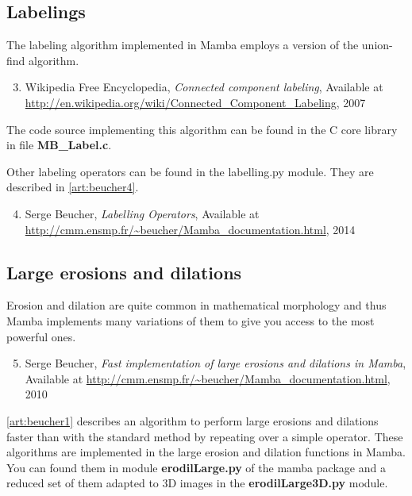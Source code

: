 \documentclass[a4paper,10pt,oneside]{article}
\begin{document}
\subsection{Labelings}

The labeling algorithm implemented in Mamba employs a version of the union-find 
algorithm.

\begin{enumerate}
\setcounter{enumi}{2}
\item \label{art:wikipedia} Wikipedia Free Encyclopedia, 
\emph{Connected component labeling},
Available at \url{http://en.wikipedia.org/wiki/Connected\_Component\_Labeling}, 2007
\end{enumerate}

The code source implementing this algorithm can be found in the C core library
in file \textbf{MB\_Label.c}.

Other labeling operators can be found in the labelling.py module. They are described in \ref{art:beucher4}.

\begin{enumerate}
\setcounter{enumi}{3}
\item \label{art:beucher4} Serge Beucher,
\emph{Labelling Operators},
Available at \url{http://cmm.ensmp.fr/\~beucher/Mamba\_documentation.html}, 2014
\end{enumerate}

\subsection{Large erosions and dilations}
\label{cha:opt_ero_dil}

Erosion and dilation are quite common in mathematical morphology and thus Mamba
implements many variations of them to give you access to the most powerful ones.

\begin{enumerate}
\setcounter{enumi}{4}
\item \label{art:beucher1} Serge Beucher,
\emph{Fast implementation of large erosions and dilations in Mamba},
Available at \url{http://cmm.ensmp.fr/\~beucher/Mamba\_documentation.html}, 2010
\end{enumerate}

\ref{art:beucher1} describes an algorithm to perform large erosions and
dilations faster than with the standard method by repeating over a simple
operator. These algorithms are implemented in the large erosion and dilation
functions in Mamba. You can found them in module \textbf{erodilLarge.py} of
the mamba package and a reduced set of them adapted to 3D images in the
\textbf{erodilLarge3D.py} module.
\end{document}
